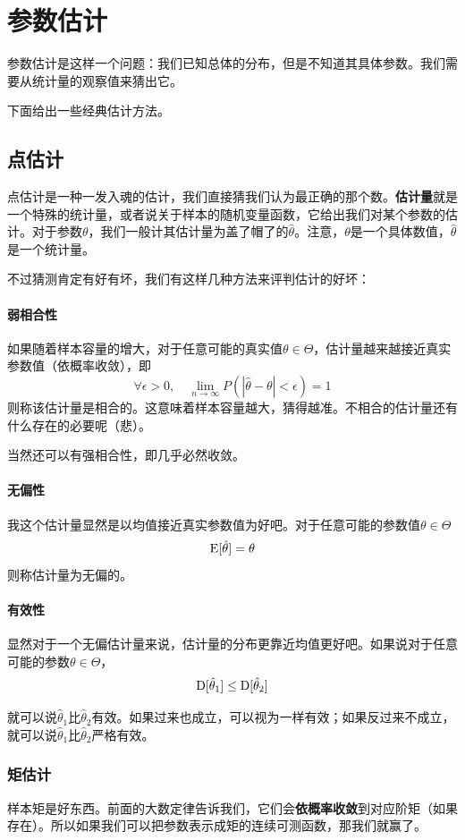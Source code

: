 \section{参数估计}
参数估计是这样一个问题：我们已知总体的分布，但是不知道其具体参数。我们需要从统计量的观察值来猜出它。

下面给出一些经典估计方法。

\subsection{点估计}
点估计是一种一发入魂的估计，我们直接猜我们认为最正确的那个数。\textbf{估计量}就是一个特殊的统计量，或者说关于样本的随机变量函数，它给出我们对某个参数的估计。对于参数$\theta$，我们一般计其估计量为盖了帽了的$\hat{\theta}$。注意，$\theta$是一个具体数值，$\hat{\theta}$是一个统计量。

不过猜测肯定有好有坏，我们有这样几种方法来评判估计的好坏：

\paragraph{弱相合性}
如果随着样本容量的增大，对于任意可能的真实值$\theta\in\Theta$，估计量越来越接近真实参数值（依概率收敛），即
\[
\forall \epsilon>0,\quad\lim_{n\to\infty} P(|\hat{\theta}-\theta|<\epsilon) = 1
\]
则称该估计量是相合的。这意味着样本容量越大，猜得越准。不相合的估计量还有什么存在的必要呢（悲）。

当然还可以有强相合性，即几乎必然收敛。
\paragraph{无偏性}
我这个估计量显然是以均值接近真实参数值为好吧。对于任意可能的参数值$\theta\in \Theta$
\[
\operatorname{E}[\hat{\theta}]=\theta
\]
则称估计量为无偏的。

\paragraph{有效性}
显然对于一个无偏估计量来说，估计量的分布更靠近均值更好吧。如果说对于任意可能的参数$\theta\in\Theta$，
\[
\operatorname{D}[\hat{\theta}_1] \leq \operatorname{D}[\hat{\theta}_2]
\]

就可以说$\hat{\theta}_1$比$\hat{\theta}_2$有效。如果过来也成立，可以视为一样有效；如果反过来不成立，就可以说$\hat{\theta}_1$比$\hat{\theta}_2$严格有效。

\subsubsection{矩估计}
样本矩是好东西。前面的大数定律告诉我们，它们会\textbf{依概率收敛}到对应阶矩（如果存在）。所以如果我们可以把参数表示成矩的连续可测函数，那我们就赢了。

